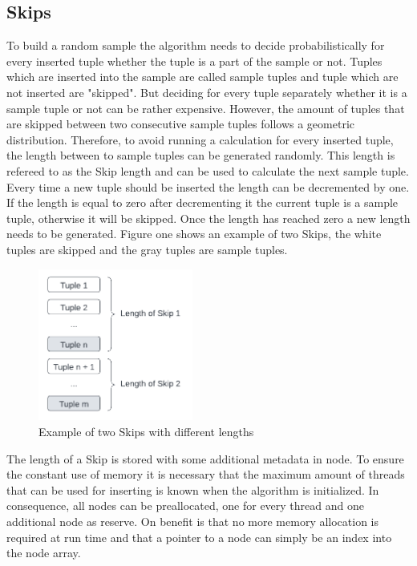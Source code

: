 \documentclass[sigconf,nonacm]{acmart}
\begin{document}
    \subsection{Skips}
        To build a random sample the algorithm needs to decide probabilistically for every inserted tuple whether the tuple is a part of the sample or not. Tuples which are inserted into the sample are called sample tuples and tuple which are not inserted are "skipped". But deciding for every tuple separately whether it is a sample tuple or not can be rather expensive. However, the amount of tuples that are skipped between two consecutive sample tuples follows a geometric distribution. Therefore, to avoid running a calculation for every inserted tuple, the length between to sample tuples can be generated randomly. This length is refereed to as the Skip length and can be used to calculate the next sample tuple. Every time a new tuple should be inserted the length can be decremented by one. If the length is equal to zero after decrementing it the current tuple is a sample tuple, otherwise it will be skipped. Once the length has reached zero a new length needs to be generated. Figure one shows an example of two Skips, 
        the white tuples are skipped and the gray tuples are sample tuples.
        \begin{figure}[h]
            \centering
            \includegraphics[height=5cm]{figure1.pdf}
            \caption{Example of two Skips with different lengths}
        \end{figure}

        The length of a Skip is stored with some additional metadata in node. To ensure the constant use of memory it is necessary that the maximum amount of threads that can be used for inserting is known when the algorithm is initialized. In consequence, all nodes can be preallocated, one for every thread and one additional node as reserve. On benefit is that no more memory allocation is required at run time and that a pointer to a node can simply be an index into the node array.
\end{document}
